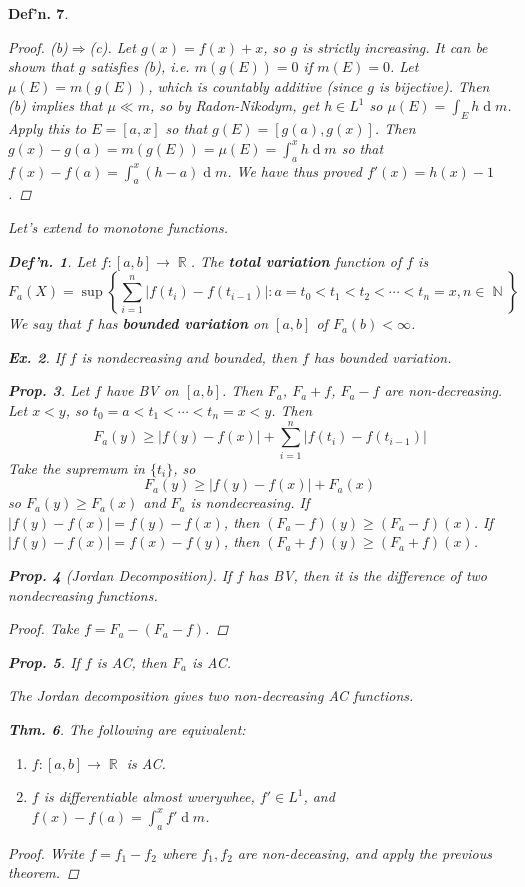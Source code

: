 \documentclass[12pt, a4paper]{book}
\DeclareMathOperator{\N}{\mathbb{N}}
\DeclareMathOperator{\R}{\mathbb{R}}
\renewcommand{\d}[1]{\ensuremath{\operatorname{d}\!{#1}}} %
\newtheorem{theorem}{Thm.}[section]
\newtheorem{definition}[theorem]{Def'n.}
\newtheorem{proposition}[theorem]{Prop.}
\newtheorem{example}[theorem]{Ex.}
\theoremstyle{nonumberplain}
\newtheorem{proof}{Proof}
\begin{document}
\begin{definition}
\begin{proof}
    (b)$\Rightarrow$(c).
    Let $g(x)=f(x)+x$, so $g$ is strictly increasing.
    It can be shown that $g$ satisfies (b), i.e. $m(g(E))=0$ if $m(E)=0$.
    Let $\mu(E)=m(g(E))$, which is countably additive (since $g$ is bijective).
    Then (b) implies that $\mu\ll m$, so by Radon-Nikodym, get $h\in L^1$ so $\mu(E)=\int_E h\d{m}$.
    Apply this to $E=[a,x]$ so that $g(E)=[g(a),g(x)]$.
    Then $g(x)-g(a)=m(g(E))=\mu(E)=\int_a^x h\d{m}$ so that $f(x)-f(a)=\int_a^x(h-a)\d{m}$.
    We have thus proved $f'(x)=h(x)-1$.
\end{proof}
Let's extend to monotone functions.
\begin{definition}
    Let $f:[a,b]\to\R$.
    The \textbf{total variation} function of $f$ is
    \[F_a(X)=\sup\left\{\sum\limits_{i=1}^n|f(t_i)-f(t_{i-1})|:a=t_0<t_1<t_2<\cdots<t_n=x,n\in\N\right\}\]
    We say that $f$ has \textbf{bounded variation} on $[a,b]$ of $F_a(b)<\infty$.
\end{definition}
\begin{example}
    If $f$ is nondecreasing and bounded, then $f$ has bounded variation.
\end{example}
\begin{proposition}
    Let $f$ have BV on $[a,b]$.
    Then $F_a$, $F_a+f$, $F_a-f$ are non-decreasing.
    Let $x<y$, so $t_0=a<t_1<\cdots<t_n=x<y$.
    Then
    \[F_a(y)\geq|f(y)-f(x)|+\sum\limits_{i=1}^n |f(t_i)-f(t_{i-1})|\]
    Take the supremum in $\{t_i\}$, so
    \[F_a(y)\geq|f(y)-f(x)|+F_a(x)\]
    so $F_a(y)\geq F_a(x)$ and $F_a$ is nondecreasing.
    If $|f(y)-f(x)|=f(y)-f(x)$, then $(F_a-f)(y)\geq(F_a-f)(x)$.
    If $|f(y)-f(x)|=f(x)-f(y)$, then $(F_a+f)(y)\geq(F_a+f)(x)$.
\end{proposition}
\begin{proposition}[Jordan Decomposition]
    If $f$ has BV, then it is the difference of two nondecreasing functions.
\end{proposition}
\begin{proof}
    Take $f=F_a-(F_a-f)$.
\end{proof}
\begin{proposition}
    If $f$ is AC, then $F_a$ is AC.
\end{proposition}
The Jordan decomposition gives two non-decreasing AC functions.
\begin{theorem}
    The following are equivalent:
    \begin{enumerate}[nolistsep]
        \item $f:[a,b]\to\R$ is AC.
        \item $f$ is differentiable almost wverywhee, $f'\in L^1$, and $f(x)-f(a)=\int_a^x f'\d{m}$.
    \end{enumerate}
\end{theorem}
\begin{proof}
    Write $f=f_1-f_2$ where $f_1,f_2$ are non-deceasing, and apply the previous theorem.
\end{proof}

\end{definition}
\end{document}
